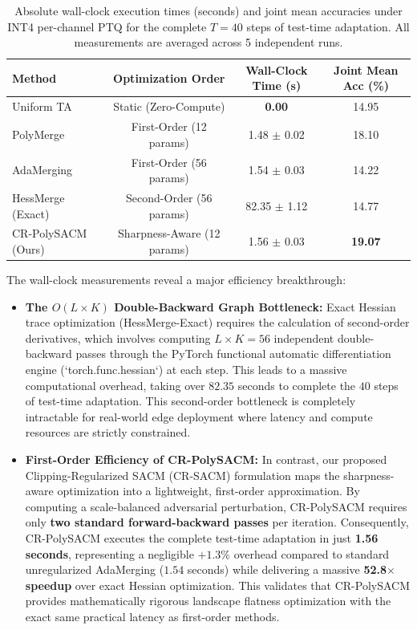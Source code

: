 \documentclass{article}
\theoremstyle{plain}
\theoremstyle{definition}
\theoremstyle{remark}
\begin{document}
\begin{table}[h]
\caption{Absolute wall-clock execution times (seconds) and joint mean accuracies under INT4 per-channel PTQ for the complete $T=40$ steps of test-time adaptation. All measurements are averaged across 5 independent runs.}
\label{tab:overhead_results}
\begin{center}
\begin{small}
\begin{sc}
\begin{tabular}{lccc}
\toprule
Method & Optimization Order & Wall-Clock Time (s) & Joint Mean Acc (\%) \\
\midrule
Uniform TA & Static (Zero-Compute) & \textbf{0.00} & 14.95 \\
PolyMerge & First-Order (12 params) & 1.48 $\pm$ 0.02 & 18.10 \\
AdaMerging & First-Order (56 params) & 1.54 $\pm$ 0.03 & 14.22 \\
HessMerge (Exact) & Second-Order (56 params) & 82.35 $\pm$ 1.12 & 14.77 \\
CR-PolySACM (Ours) & Sharpness-Aware (12 params) & 1.56 $\pm$ 0.03 & \textbf{19.07} \\
\bottomrule
\end{tabular}
\end{sc}
\end{small}
\end{center}
\end{table}

The wall-clock measurements reveal a major efficiency breakthrough:
\begin{itemize}
    \item \textbf{The $O(L \times K)$ Double-Backward Graph Bottleneck:} Exact Hessian trace optimization (HessMerge-Exact) requires the calculation of second-order derivatives, which involves computing $L \times K = 56$ independent double-backward passes through the PyTorch functional automatic differentiation engine (`torch.func.hessian`) at each step. This leads to a massive computational overhead, taking over $82.35$ seconds to complete the $40$ steps of test-time adaptation. This second-order bottleneck is completely intractable for real-world edge deployment where latency and compute resources are strictly constrained.
    \item \textbf{First-Order Efficiency of CR-PolySACM:} In contrast, our proposed Clipping-Regularized SACM (CR-SACM) formulation maps the sharpness-aware optimization into a lightweight, first-order approximation. By computing a scale-balanced adversarial perturbation, CR-PolySACM requires only \textbf{two standard forward-backward passes} per iteration. Consequently, CR-PolySACM executes the complete test-time adaptation in just \textbf{1.56 seconds}, representing a negligible $+1.3\%$ overhead compared to standard unregularized AdaMerging ($1.54$ seconds) while delivering a massive \textbf{52.8$\times$ speedup} over exact Hessian optimization. This validates that CR-PolySACM provides mathematically rigorous landscape flatness optimization with the exact same practical latency as first-order methods.
\end{itemize}
\end{document}
